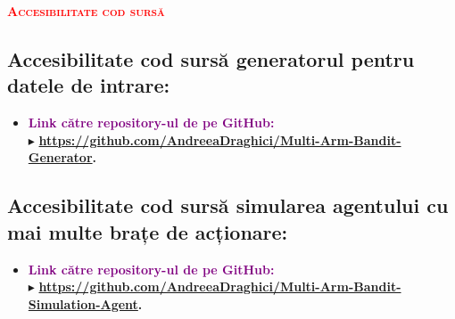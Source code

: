 \documentclass{article}
\begin{document}
\tableofcontents
\listoffigures
\vspace{12mm}
\listoftables
\vspace{12mm}
\begin{center}
	    \textcolor{red}{\Large\bfseries\scshape {Accesibilitate cod sursă}}
\end{center}

\subsection*{Accesibilitate cod sursă generatorul pentru datele de intrare:}
\begin{itemize}
  \item\textbf{\textcolor{purple}{Link către repository-ul de pe GitHub:}} \\
   $\blacktriangleright$ \textbf{ {\small \url{https://github.com/AndreeaDraghici/Multi-Arm-Bandit-Generator}.}}
\end{itemize}

\subsection*{Accesibilitate cod sursă simularea agentului cu mai multe brațe de acționare:}
\begin{itemize}
  \item\textbf{\textcolor{purple}{Link către repository-ul de pe GitHub:}} \\
   $\blacktriangleright$ \textbf{ {\small \url{https://github.com/AndreeaDraghici/Multi-Arm-Bandit-Simulation-Agent}}.}
\end{itemize}
\end{document}
